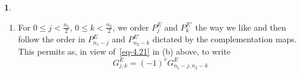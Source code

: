 \documentclass[a4paper,12pt]{article}
\theoremstyle{definition}
\theoremstyle{underlinethm}
\theoremstyle{definition}
\newtheorem{subsubsec}{}[subsection]
\begin{document}
\begin{subsubsec}
\begin{enumerate}[label=(\alph*)]
\item For $0 \leq j < \frac{n_{1}}{2}$, $0 \leq k < \frac{n_{2}}{2}$, we order $P_{j}^{E}$ and $P_{k}^{E'}$ the way we like and then follow the order in $P_{n_{1}-j}^{E}$ and $P_{n_{2}-k}^{E'}$ dictated by the complementation maps. This permits as, in view of~\eqref{eq-4.21} in (b) above, to write
\begin{equation}
G_{j,k}^{E} = (-1)^{v} G_{n_{1}-j, n_{2}-k}^{E} \tag{4.22}\label{eq-4.22}
\end{equation}

\end{enumerate}

\end{subsubsec}
\end{document}

